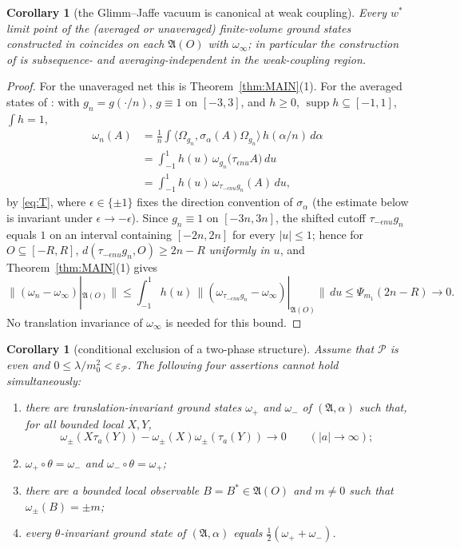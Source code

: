 \documentclass[11pt,a4paper]{article}
\theoremstyle{plain}
\newtheorem{corollary}[theorem]{Corollary}
\theoremstyle{definition}
\newcommand{\A}{\mathfrak{A}}
\newcommand{\Om}{\Omega}
\newcommand{\ip}[2]{\langle #1,#2\rangle}
\DeclareMathOperator{\supp}{supp}
\begin{document}
\begin{corollary}[the Glimm--Jaffe vacuum is canonical at weak coupling]\label{cor:canonical}
Every $w^*$ limit point of the (averaged or unaveraged) finite-volume ground states constructed
in \cite[\S2]{GJ3} coincides on each $\A(O)$ with $\omega_\infty$; in particular the
construction of \cite{GJ3} is subsequence- and averaging-independent in the weak-coupling
region.
\end{corollary}

\begin{proof}
For the unaveraged net this is Theorem~\ref{thm:MAIN}(1). For the averaged states of
\cite[(2.3)--(2.5)]{GJ3}: with $g_n=g(\cdot/n)$, $g\equiv1$ on $[-3,3]$, and $h\ge0$,
$\supp h\subseteq[-1,1]$, $\int h=1$,
\begin{align*}
  \omega_n(A)
  &=\frac1n\int\ip{\Om_{g_n}}{\sigma_\alpha(A)\Om_{g_n}}\,
      h(\alpha/n)\,d\alpha\\
  &=\int_{-1}^{1}h(u)\,\omega_{g_n}\bigl(\tau_{\epsilon nu}A\bigr)\,du\\
  &=\int_{-1}^{1}h(u)\,\omega_{\tau_{-\epsilon nu}g_n}(A)\,du ,
\end{align*}
by \eqref{eq:T}, where $\epsilon\in\{\pm1\}$ fixes the direction convention of $\sigma_\alpha$
(the estimate below is invariant under $\epsilon\to-\epsilon$). Since $g_n\equiv1$ on
$[-3n,3n]$, the shifted cutoff $\tau_{-\epsilon nu}g_n$ equals $1$ on an interval containing
$[-2n,2n]$ for every $|u|\le1$; hence for $O\subseteq[-R,R]$,
$d(\tau_{-\epsilon nu}g_n,O)\ge2n-R$ \emph{uniformly in $u$}, and Theorem~\ref{thm:MAIN}(1)
gives
\[
  \|(\omega_n-\omega_\infty)|_{\A(O)}\|
  \le\int_{-1}^1h(u)\,\bigl\|(\omega_{\tau_{-\epsilon nu}g_n}-\omega_\infty)|_{\A(O)}\bigr\|\,du
  \le\Psi_{m_1}(2n-R)\longrightarrow0 .
\]
No translation invariance of $\omega_\infty$ is needed for this bound.
\end{proof}

\begin{corollary}[conditional exclusion of a two-phase structure]\label{cor:nobreak}
Assume that $\mathscr P$ is even and $0\le\lambda/m_0^2<\varepsilon_{\mathscr P}$. The following
four assertions cannot hold simultaneously:
\begin{enumerate}
\item[\rm(B1)] there are translation-invariant ground states $\omega_+$ and $\omega_-$ of
      $(\A,\alpha)$ such that, for all bounded local $X,Y$,
      \[
       \omega_\pm(X\tau_a(Y))-\omega_\pm(X)\omega_\pm(\tau_a(Y))
       \longrightarrow0\qquad(|a|\to\infty);
      \]
\item[\rm(B2)] $\omega_+\circ\theta=\omega_-$ and $\omega_-\circ\theta=\omega_+$;
\item[\rm(B3)] there are a bounded local observable $B=B^*\in\A(O)$ and $m\ne0$ such that
      $\omega_\pm(B)=\pm m$;
\item[\rm(B4)] every $\theta$-invariant ground state of $(\A,\alpha)$ equals
      $\frac12(\omega_++\omega_-)$.
\end{enumerate}
\end{corollary}
\end{document}
